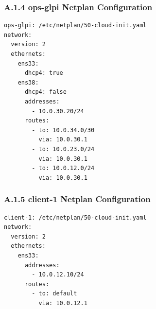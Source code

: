 \documentclass[11pt]{article}
\begin{document}

\subsubsection{A.1.4 ops-glpi Netplan Configuration}
\label{sec:appendix-a-ops-glpi-netplan-config}

\begin{verbatim}
ops-glpi: /etc/netplan/50-cloud-init.yaml
network:
  version: 2
  ethernets:
    ens33:
      dhcp4: true
    ens38:
      dhcp4: false
      addresses:
        - 10.0.30.20/24
      routes:
        - to: 10.0.34.0/30
          via: 10.0.30.1
        - to: 10.0.23.0/24
          via: 10.0.30.1
        - to: 10.0.12.0/24
          via: 10.0.30.1
\end{verbatim}


\subsubsection{A.1.5 client-1 Netplan Configuration}
\label{sec:appendix-a-client-1-netplan-config}

\begin{verbatim}
client-1: /etc/netplan/50-cloud-init.yaml
network:
  version: 2
  ethernets:
    ens33:
      addresses:
        - 10.0.12.10/24
      routes:
        - to: default
          via: 10.0.12.1
\end{verbatim}

\end{document}
